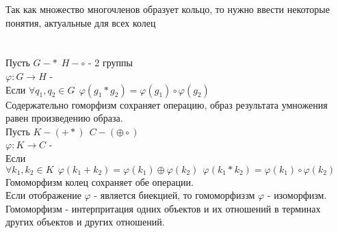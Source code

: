 Так как множество многочленов образует кольцо, то нужно ввести некоторые
понятия, актуальные для всех колец \\

 \\
 \\
Пусть $G - * ~~ H - \circ$ - 2 группы \\
$\varphi: G \to H$ -  \\
Если $\forall q_{1},q_{2} \in G ~~ \varphi(g_{1} * g_{2}) = \varphi(g_{1}) \circ
\varphi(g_{2})$ \\
Содержательно гоморфизм сохраняет операцию, образ результата умножения равен
произведению образа. \\

Пусть $K - (+*) ~~ C - (\oplus \circ)$ \\
$\varphi: K \to C$ -  \\
Если $\forall k_{1}, k_{2} \in K ~~ \varphi(k_{1} + k_{2}) = \varphi(k_{1})
\oplus \varphi(k_{2}) ~~ \varphi(k_{1} * k_{2}) = \varphi(k_{1}) \circ
\varphi(k_{2})$ \\
Гомоморфизм колец сохраняет обе операции. \\

Если отображение $\varphi$ - является биекцией, то гомоморфиззм $\varphi$ -
изоморфизм. \\

Гомоморфизм - интерпритация одних объектов и их отношений в терминах других
объектов и других отношений. \\
